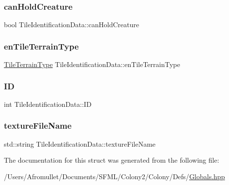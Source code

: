 \subsubsection{\texorpdfstring{can\+Hold\+Creature}{canHoldCreature}}
{\footnotesize\ttfamily bool Tile\+Identification\+Data\+::can\+Hold\+Creature}

\mbox{\label{struct_tile_identification_data_a966505adf98464160d947a95818a8d36}} 
\subsubsection{\texorpdfstring{en\+Tile\+Terrain\+Type}{enTileTerrainType}}
{\footnotesize\ttfamily \mbox{\hyperlink{_enum_types_8hpp_a462b3f8c270b48544fc9c2e167a3f6e5}{Tile\+Terrain\+Type}} Tile\+Identification\+Data\+::en\+Tile\+Terrain\+Type}

\mbox{\label{struct_tile_identification_data_af8dc97a27969926817e80d13d3d6c7b9}} 
\subsubsection{\texorpdfstring{ID}{ID}}
{\footnotesize\ttfamily int Tile\+Identification\+Data\+::\+ID}

\mbox{\label{struct_tile_identification_data_a4b60c03f60c758ffabdcfd90c183d2b3}} 
\subsubsection{\texorpdfstring{texture\+File\+Name}{textureFileName}}
{\footnotesize\ttfamily std\+::string Tile\+Identification\+Data\+::texture\+File\+Name}



The documentation for this struct was generated from the following file\+:\begin{DoxyCompactItemize}
\item 
/\+Users/\+Afromullet/\+Documents/\+S\+F\+M\+L/\+Colony2/\+Colony/\+Defs/\mbox{\hyperlink{_globals_8hpp}{Globals.\+hpp}}\end{DoxyCompactItemize}
